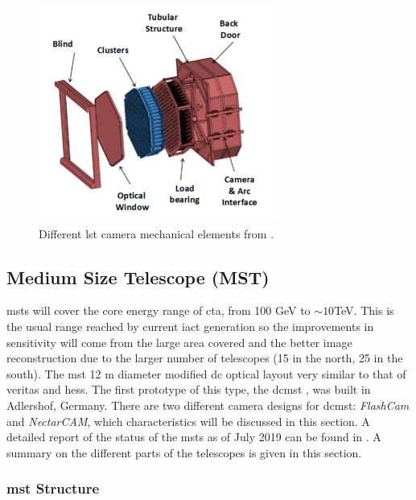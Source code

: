 \documentclass[main.tex]{subfiles}
\begin{document}
\begin{figure}
\centering
 \includegraphics[width=0.7\textwidth]{Pictures/LSTcamerastructure.pdf}
  \caption{Different \gls{lst} camera mechanical elements from \cite{2013LSTCamMech}.}
    \label{fig:LSTcammech}
\end{figure}

\subsection{Medium Size Telescope (MST)} \label{sec:MST}

\glspl{mst} will cover the core energy range of \gls{cta}, from 100 GeV to $\sim 10$TeV. This is the usual range reached by current \gls{iact} generation so the improvements in sensitivity will come from the large area covered and the better image reconstruction due to the larger number of telescopes (15 in the north, 25 in the south).
The \gls{mst} 12 m diameter modified \gls{dc} optical layout very similar to that of \gls{veritas} and \gls{hess}. The first prototype of this type, the \gls{dcmst} \cite{2017SCMSTstatus}, was built in Adlershof, Germany. There are two different camera designs for \gls{dcmst}: \textit{FlashCam} and \textit{NectarCAM}, which characteristics will be discussed in this section.
A detailed report of the status of the \glspl{mst} as of July 2019 can be found in \cite{2019MSTreport}. A summary on the different parts of the telescopes is given in this section.

\subsubsection{\gls{mst} Structure}
\end{document}
